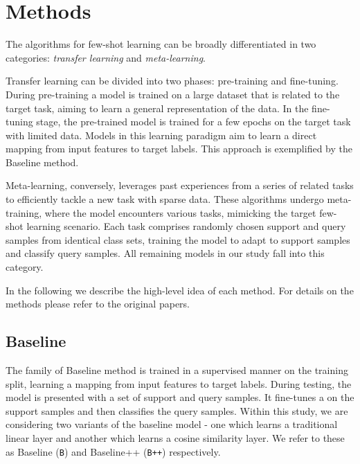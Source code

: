 \section{Methods}

The algorithms for few-shot learning can be broadly differentiated in two categories: \textit{transfer learning} and \textit{meta-learning}.

Transfer learning can be divided into two phases: pre-training and fine-tuning. During pre-training a model is trained on a large dataset that is related to the target task, aiming to learn a general representation of the data. In the fine-tuning stage, the pre-trained model is trained for a few epochs on the target task with limited data. Models in this learning paradigm aim to learn a direct mapping from input features to target labels. This approach is exemplified by the Baseline method.

Meta-learning, conversely, leverages past experiences from a series of related tasks to efficiently tackle a new task with sparse data. These algorithms undergo meta-training, where the model encounters various tasks, mimicking the target few-shot learning scenario. Each task comprises randomly chosen support and query samples from identical class sets, training the model to adapt to support samples and classify query samples. All remaining models in our study fall into this category.

In the following we describe the high-level idea of each method. For details on the methods please refer to the original papers.


\subsection{Baseline}

The family of Baseline method is trained in a supervised manner on the training split, learning a mapping from input features to target labels. During testing, the model is presented with a set of support and query samples. It fine-tunes a on the support samples and then classifies the query samples. Within this study, we are considering two variants of the baseline model - one which learns a traditional linear layer and another which learns a cosine similarity layer. We refer to these as Baseline (\texttt{B}) and Baseline++ (\texttt{B++}) respectively.

